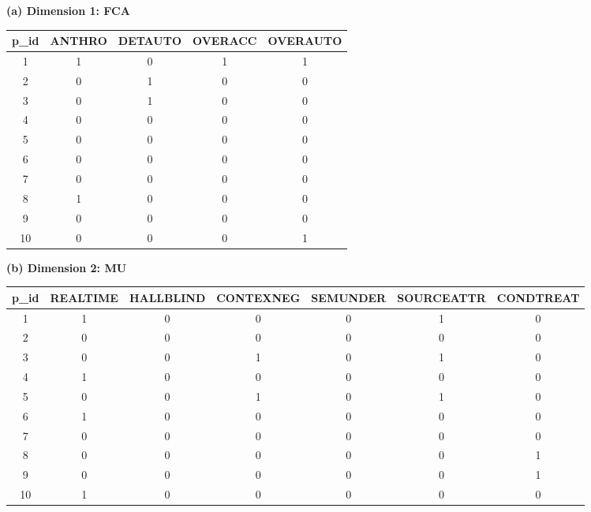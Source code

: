 \begin{table}
\centering
\setlength{\tabcolsep}{5pt}
\renewcommand{\arraystretch}{1.1}
\begin{minipage}[t]{0.36\textwidth}
\centering
\small
\textbf{(a) Dimension 1: FCA}

\vspace{0.4em}

\begin{tabular}{ccccc}
\hline
\scriptsize p\_id &
\scriptsize ANTHRO &
\scriptsize DETAUTO &
\scriptsize OVERACC &
\scriptsize OVERAUTO \\
\hline
1  & 1 & 0 & 1 & 1 \\
2  & 0 & 1 & 0 & 0 \\
3  & 0 & 1 & 0 & 0 \\
4  & 0 & 0 & 0 & 0 \\
5  & 0 & 0 & 0 & 0 \\
6  & 0 & 0 & 0 & 0 \\
7  & 0 & 0 & 0 & 0 \\
8  & 1 & 0 & 0 & 0 \\
9  & 0 & 0 & 0 & 0 \\
10 & 0 & 0 & 0 & 1 \\
\hline
\end{tabular}
\end{minipage}
\hfill
\begin{minipage}[t]{0.60\textwidth}
\centering
\scriptsize
\textbf{(b) Dimension 2: MU}

\vspace{0.4em}

\setlength{\tabcolsep}{3pt}

\begin{tabular}{ccccccc}
\hline
p\_id &
REALTIME &
HALLBLIND &
CONTEXNEG &
SEMUNDER &
SOURCEATTR &
CONDTREAT \\
\hline
1  & 1 & 0 & 0 & 0 & 1 & 0 \\
2  & 0 & 0 & 0 & 0 & 0 & 0 \\
3  & 0 & 0 & 1 & 0 & 1 & 0 \\
4  & 1 & 0 & 0 & 0 & 0 & 0 \\
5  & 0 & 0 & 1 & 0 & 1 & 0 \\
6  & 1 & 0 & 0 & 0 & 0 & 0 \\
7  & 0 & 0 & 0 & 0 & 0 & 0 \\
8  & 0 & 0 & 0 & 0 & 0 & 1 \\
9  & 0 & 0 & 0 & 0 & 0 & 1 \\
10 & 1 & 0 & 0 & 0 & 0 & 0 \\
\hline
\end{tabular}
\end{minipage}


\end{table}
